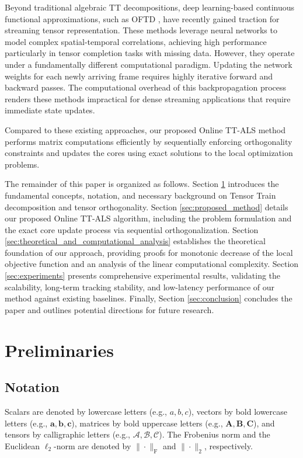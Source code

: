 \documentclass[a4paper, 11pt]{article}
\theoremstyle{plain}
\theoremstyle{definition}
\theoremstyle{remark}
\begin{document}
Beyond traditional algebraic TT decompositions, deep learning-based continuous functional approximations, such as OFTD \citep{OFTD}, have recently gained traction for streaming tensor representation.
These methods leverage neural networks to model complex spatial-temporal correlations, achieving high performance particularly in tensor completion tasks with missing data.
However, they operate under a fundamentally different computational paradigm.
Updating the network weights for each newly arriving frame requires highly iterative forward and backward passes.
The computational overhead of this backpropagation process renders these methods impractical for dense streaming applications that require immediate state updates.

Compared to these existing approaches, our proposed Online TT-ALS method performs matrix computations efficiently by sequentially enforcing orthogonality constraints and updates the cores using exact solutions to the local optimization problems.

The remainder of this paper is organized as follows.
Section \ref{sec:preliminaries} introduces the fundamental concepts, notation, and necessary background on Tensor Train decomposition and tensor orthogonality.
Section \ref{sec:proposed_method} details our proposed Online TT-ALS algorithm, including the problem formulation and the exact core update process via sequential orthogonalization.
Section \ref{sec:theoretical_and_computational_analysis} establishes the theoretical foundation of our approach, providing proofs for monotonic decrease of the local objective function and an analysis of the linear computational complexity.
Section \ref{sec:experiments} presents comprehensive experimental results, validating the scalability, long-term tracking stability, and low-latency performance of our method against existing baselines.
Finally, Section \ref{sec:conclusion} concludes the paper and outlines potential directions for future research.

\section{Preliminaries}
\label{sec:preliminaries}
\subsection{Notation}
Scalars are denoted by lowercase letters (e.g., $a, b, c$), vectors by bold lowercase letters (e.g., $\bm{a}, \bm{b}, \bm{c}$), matrices by bold uppercase letters (e.g., $\mathbf{A}, \mathbf{B}, \mathbf{C}$), and tensors by calligraphic letters (e.g., $\mathcal{A}, \mathcal{B}, \mathcal{C}$).
The Frobenius norm and the Euclidean $\ell_2$-norm are denoted by $\|\cdot\|_\mathrm{F}$ and $\|\cdot\|_2$, respectively.
\end{document}
